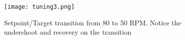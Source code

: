 \documentclass[11pt,fleqn]{book} %
\begin{document}

\begin{figure}[]
    \begin{center}
        \hspace*{-3.4cm}
        \texttt{[image: tuning3.png]}
        \caption{Setpoint/Target transition from 80 to 50 RPM. Notice the undershoot and recovery on the transition}
        \label{tuning3}
    \end{center}
\end{figure}

%
%
%
%
%
%
%
%
%
%
\end{document}
